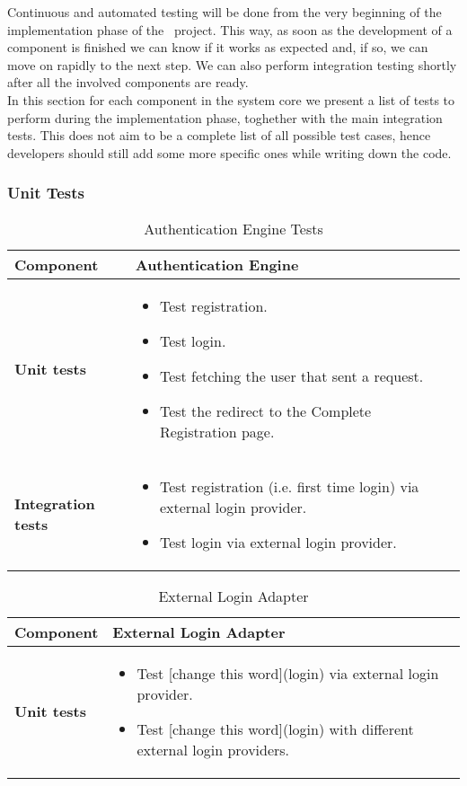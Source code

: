 Continuous and automated testing will be done from the very beginning of the implementation phase of the \projectname~project. This way, as soon as the development of a component is finished we can know if it works as expected and, if so, we can move on rapidly to the next step. We can also perform integration testing shortly after all the involved components are ready. \\
In this section for each component in the system core we present a list of tests to perform during the implementation phase, toghether with the main integration tests. This does not aim to be a complete list of all possible test cases, hence developers should still add some more specific ones while writing down the code. \\

\subsubsection{Unit Tests}

\begin{table}[h]	
	\centering
	\def\arraystretch{1.5}
	\begin{tabular}{|m{4cm}|m{12cm}|}
		\hline
		\textbf{Component} & Authentication Engine \\ \hline
		\textbf{Unit tests} & 
			\begin{itemize}
			\item Test registration.
			\item Test login.
			\item Test fetching the user that sent a request.
			\item Test the redirect to the Complete Registration page.
			\end{itemize} \\ \hline
		\textbf{Integration tests} &
			\begin{itemize} 
			\item Test registration (i.e. first time login) via external login provider.
			\item Test login via external login provider. 
			\end{itemize} \\ \hline
	\end{tabular}
	\caption{Authentication Engine Tests}
\end{table}

\begin{table}[h]	
	\centering
	\def\arraystretch{1.5}
	\begin{tabular}{|m{4cm}|m{12cm}|}
		\hline
		\textbf{Component} & External Login Adapter \\ \hline
		\textbf{Unit tests} & 
			\begin{itemize}
			\item Test [change this word](login) via external login provider.
			\item Test [change this word](login) with different external login providers.
			\end{itemize} \\ \hline
	\end{tabular}
	\caption{External Login Adapter}
\end{table}

